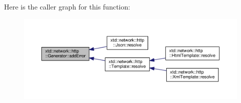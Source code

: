 Here is the caller graph for this function\-:
\nopagebreak
\begin{figure}[H]
\begin{center}
\leavevmode
\includegraphics[width=350pt]{classxtd_1_1network_1_1http_1_1Generator_a289cfd48cc9c5646c8f06455df41f09d_icgraph}
\end{center}
\end{figure}


